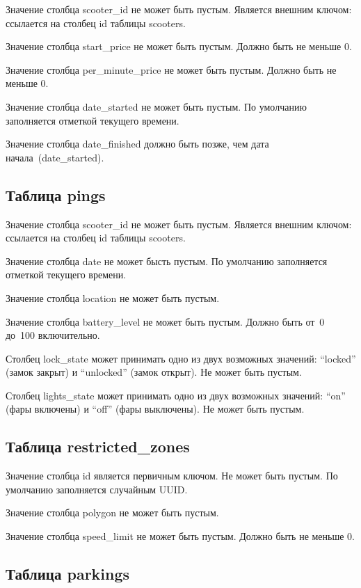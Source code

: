 Значение столбца scooter\_id не может быть пустым. Является внешним ключом: ссылается на столбец id таблицы scooters.

Значение столбца start\_price не может быть пустым. Должно быть не меньше 0.

Значение столбца per\_minute\_price не может быть пустым. Должно быть не меньше 0.

Значение столбца date\_started не может быть пустым. По умолчанию заполняется отметкой текущего времени.

Значение столбца date\_finished должно быть позже, чем дата начала~(date\_started).

\subsection{Таблица pings}

Значение столбца scooter\_id не может быть пустым. Является внешним ключом: ссылается на столбец id таблицы scooters.

Значение столбца date не может бысть пустым. По умолчанию заполняется отметкой текущего времени.

Значение столбца location не может быть пустым.

Значение столбца battery\_level не может быть пустым. Должно быть от~0 до~100 включительно.

Столбец lock\_state может принимать одно из двух возможных значений: \enquote{locked} (замок закрыт) и \enquote{unlocked} (замок открыт). Не может быть пустым.

Столбец lights\_state может принимать одно из двух возможных значений: \enquote{on} (фары включены) и \enquote{off} (фары выключены). Не может быть пустым.

\subsection{Таблица restricted\_zones}

Значение столбца id является первичным ключом. Не может быть пустым. По умолчанию заполняется случайным UUID.

Значение столбца polygon не может быть пустым.

Значение столбца speed\_limit не может быть пустым. Должно быть не меньше 0.

\subsection{Таблица parkings}


